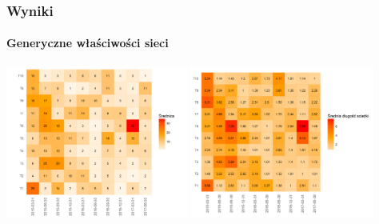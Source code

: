 \documentclass[]{beamer}
\newcommand{\sizequad}{0.45}
\begin{document}
\begin{frame}
 \frametitle{Wyniki}
 \framesubtitle{Generyczne właściwości sieci}
  \begin{minipage}{\textwidth}
     \centering
 			\includegraphics[width=\sizequad\textwidth]{pictures/srednica/srednica_hm.png}\quad  
            \includegraphics[width=\sizequad\textwidth]{pictures/srednia_dlugosc_sciezki/srednia_dlugosc_sciezki_hm.png}  \\

\end{minipage}
\end{frame}
\end{document}
